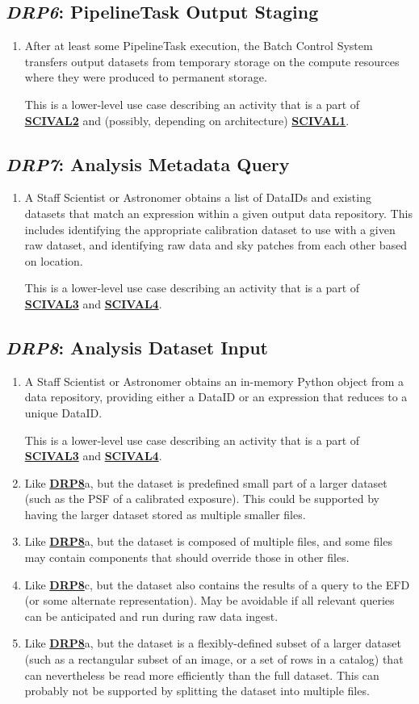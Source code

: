 \documentclass[DM,toc,lsstdraft]{lsstdoc}
\newcommand{\usecase}[3]{%
\subsection{\emph{#1}: #2}
\label{use:#1}
\begin{enumerate}[label=\alph*.]
#3
\end{enumerate}
}
\newcommand{\useref}[1]{\hyperref[use:#1]{\textcolor{lsstblue}{\textbf{#1}}}}
\begin{document}
\usecase{DRP6}{PipelineTask Output Staging}{%

\item
After at least some PipelineTask execution, the Batch Control System transfers output datasets from temporary storage on the compute resources where they were produced to permanent storage.

This is a lower-level use case describing an activity that is a part of \useref{SCIVAL2} and (possibly, depending on architecture) \useref{SCIVAL1}.

}

\usecase{DRP7}{Analysis Metadata Query}{%

\item
A Staff Scientist or Astronomer obtains a list of DataIDs and existing datasets that match an expression within a given output data repository.
This includes identifying the appropriate calibration dataset to use with a given raw dataset, and identifying raw data and sky patches from each other based on location.

This is a lower-level use case describing an activity that is a part of \useref{SCIVAL3} and \useref{SCIVAL4}.
}

\usecase{DRP8}{Analysis Dataset Input}{%

\item
A Staff Scientist or Astronomer obtains an in-memory Python object from a data repository, providing either a DataID or an expression that reduces to a unique DataID.

This is a lower-level use case describing an activity that is a part of \useref{SCIVAL3} and \useref{SCIVAL4}.

\item
Like \useref{DRP8}a, but the dataset is predefined small part of a larger dataset (such as the PSF of a calibrated exposure).
This could be supported by having the larger dataset stored as multiple smaller files.

\item
Like \useref{DRP8}a, but the dataset is composed of multiple files, and some files may contain components that should override those in other files.

\item
Like \useref{DRP8}c, but the dataset also contains the results of a query to the EFD (or some alternate representation).
May be avoidable if all relevant queries can be anticipated and run during raw data ingest.

\item
Like \useref{DRP8}a, but the dataset is a flexibly-defined subset of a larger dataset (such as a rectangular subset of an image, or a set of rows in a catalog) that can nevertheless be read more efficiently than the full dataset.
This can probably not be supported by splitting the dataset into multiple files.
}
\end{document}
